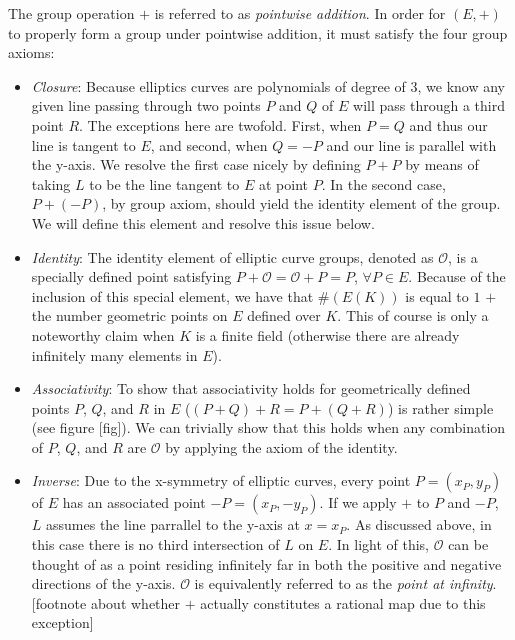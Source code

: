 The group operation $+$ is referred to as \emph{pointwise addition}. In order for $(E,+)$ to properly form a group under pointwise addition, it must satisfy the four group axioms:
\begin{itemize}
\item \emph{Closure}: Because elliptics curves are polynomials of degree of 3, we know any given line passing through two points $P$ and $Q$ of $E$ will pass through a third point $R$. The exceptions here are twofold. First, when $P = Q$ and thus our line is tangent to $E$, and second, when $Q = -P$ and our line is parallel with the y-axis. We resolve the first case nicely by defining $P + P$ by means of taking $L$ to be the line tangent to $E$ at point $P$. In the second case, $P + (-P)$, by group axiom, should yield the identity element of the group. We will define this element and resolve this issue below.  
\item \emph{Identity}: The identity element of elliptic curve groups, denoted as $\mathcal{O}$, is a specially defined point satisfying $P + \mathcal{O} = \mathcal{O} + P = P$, $\forall P \in E$. Because of the inclusion of this special element, we have that $\#(E(K))$ is equal to $1$ $+$ the number geometric points on $E$ defined over $K$. This of course is only a noteworthy claim when $K$ is a finite field (otherwise there are already infinitely many elements in $E$).
\item \emph{Associativity}: To show that associativity holds for geometrically defined points $P$, $Q$, and $R$ in $E$ ($(P + Q) + R = P + (Q + R)$) is rather simple (see figure [fig]). We can trivially show that this holds when any combination of $P$, $Q$, and $R$ are $\mathcal{O}$ by applying the axiom of the identity.
\item \emph{Inverse}: Due to the x-symmetry of elliptic curves, every point $P = (x_P, y_P)$ of $E$ has an associated point $-P = (x_P, -y_P)$. If we apply $+$ to $P$ and $-P$, $L$ assumes the line parrallel to the y-axis at $x = x_P$. As discussed above, in this case there is no third intersection of $L$ on $E$. In light of this, $\mathcal{O}$ can be thought of as a point residing infinitely far in both the positive and negative directions of the y-axis. $\mathcal{O}$ is equivalently referred to as the \emph{point at infinity}.[footnote about whether $+$ actually constitutes a rational map due to this exception]
\end{itemize}

